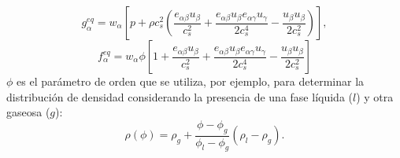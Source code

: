 \begin{equation}
	g_{\alpha}^{eq} = w_{\alpha}\left[ p + \rho c_s^2 \left( \dfrac{e_{{\alpha}\beta}u_{\beta}}{c_s^2}  + \dfrac{e_{\alpha\beta}u_{\beta}e_{{\alpha}\gamma}u_{\gamma}}{2c_s^4} - \dfrac{u_{\beta}u_{\beta}}{2c_s^2} \right)  \right],
\end{equation}
\begin{equation}
	f_{\alpha}^{eq} = w_{\alpha} \phi \left[ 1 + \dfrac{e_{{\alpha}\beta}u_{\beta}}{c_s^2}  + \dfrac{e_{\alpha\beta}u_{\beta}e_{{\alpha}\gamma}u_{\gamma}}{2c_s^4} - \dfrac{u_{\beta}u_{\beta}}{2c_s^2}  \right]
\end{equation}
$\phi$ es el par\'ametro de orden que se utiliza, por ejemplo, para determinar la distribuci\'on de densidad considerando la presencia de una fase l\'iquida ($l$) y otra gaseosa ($g$):
\begin{equation}
	\rho(\phi) = \rho_g + \dfrac{\phi - \phi_g}{\phi_l - \phi_g}(\rho_l - \rho_g).
\end{equation}

